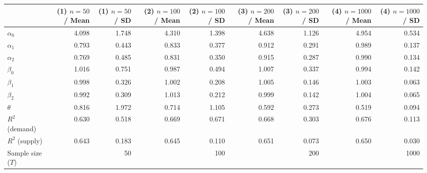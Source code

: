 
\begin{tabular}[t]{lrrrrrrrr}
\toprule
  & (1) $n=50$ / Mean & (1) $n=50$ / SD & (2) $n=100$ / Mean & (2) $n=100$ / SD & (3) $n=200$ / Mean & (3) $n=200$ / SD & (4) $n=1000$ / Mean & (4) $n=1000$ / SD\\
\midrule
$\alpha_{0}$ & 4.098 & 1.748 & 4.310 & 1.398 & 4.638 & 1.126 & 4.954 & 0.534\\
$\alpha_{1}$ & 0.793 & 0.443 & 0.833 & 0.377 & 0.912 & 0.291 & 0.989 & 0.137\\
$\alpha_{2}$ & 0.769 & 0.485 & 0.831 & 0.350 & 0.915 & 0.287 & 0.990 & 0.134\\
$\beta_{0}$ & 1.016 & 0.751 & 0.987 & 0.494 & 1.007 & 0.337 & 0.994 & 0.142\\
$\beta_{1}$ & 0.998 & 0.326 & 1.002 & 0.208 & 1.005 & 0.146 & 1.003 & 0.063\\
$\beta_{2}$ & 0.992 & 0.309 & 1.013 & 0.212 & 0.999 & 0.142 & 1.004 & 0.065\\
$\theta$ & 0.816 & 1.972 & 0.714 & 1.105 & 0.592 & 0.273 & 0.519 & 0.094\\
$R^{2}$ (demand) & 0.630 & 0.518 & 0.669 & 0.671 & 0.668 & 0.303 & 0.676 & 0.113\\
$R^{2}$ (supply) & 0.643 & 0.183 & 0.645 & 0.110 & 0.651 & 0.073 & 0.650 & 0.030\\
Sample size ($T$) &  & 50 &  & 100 &  & 200 &  & 1000\\
\bottomrule
\end{tabular}
